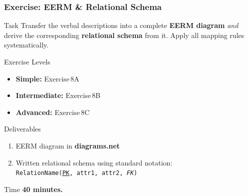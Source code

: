 \begin{frame}
  \frametitle{Exercise: EERM \& Relational Schema}

  \begin{block}{Task}
    Transfer the verbal descriptions into a complete \textbf{EERM diagram} \textit{and} derive the corresponding \textbf{relational schema} from it. Apply all mapping rules systematically.
  \end{block}

  \begin{block}{Exercise Levels}
    \begin{itemize}
      \item \textbf{Simple:} Exercise\,8A
      \item \textbf{Intermediate:} Exercise\,8B
      \item \textbf{Advanced:} Exercise\,8C
    \end{itemize}
  \end{block}

  \begin{block}{Deliverables}
    \begin{enumerate}
      \item EERM diagram in \textbf{diagrams.net}
      \item Written relational schema using standard notation:\\
            \texttt{RelationName(\underline{PK}, attr1, attr2, \textit{FK})}
    \end{enumerate}
  \end{block}

  \begin{examples}{Time}
    \textbf{40 minutes.}
  \end{examples}
\end{frame}
